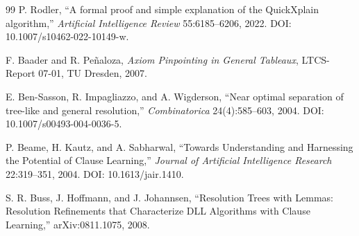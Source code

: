 \documentclass[11pt]{article}
\theoremstyle{remark}
\begin{document}
\begin{thebibliography}{99}
P. Rodler, ``A formal proof and simple explanation of the QuickXplain algorithm,'' \emph{Artificial Intelligence Review} 55:6185--6206, 2022. DOI: 10.1007/s10462-022-10149-w.

F. Baader and R. Pe\~naloza, \emph{Axiom Pinpointing in General Tableaux}, LTCS-Report 07-01, TU Dresden, 2007.

E. Ben-Sasson, R. Impagliazzo, and A. Wigderson, ``Near optimal separation of tree-like and general resolution,'' \emph{Combinatorica} 24(4):585--603, 2004. DOI: 10.1007/s00493-004-0036-5.

P. Beame, H. Kautz, and A. Sabharwal, ``Towards Understanding and Harnessing the Potential of Clause Learning,'' \emph{Journal of Artificial Intelligence Research} 22:319--351, 2004. DOI: 10.1613/jair.1410.

S. R. Buss, J. Hoffmann, and J. Johannsen, ``Resolution Trees with Lemmas: Resolution Refinements that Characterize DLL Algorithms with Clause Learning,'' arXiv:0811.1075, 2008.



\end{thebibliography}
\end{document}
